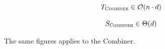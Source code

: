 \documentclass[parskip=full]{report}
\begin{document}
\[
T_\textsc{Combiner} \in \mathcal{O}(n \cdot d)
\]


\[
S_\textsc{Combiner} \in \Theta(d)
\]

The same figures applies to the Combiner.

\end{document}
